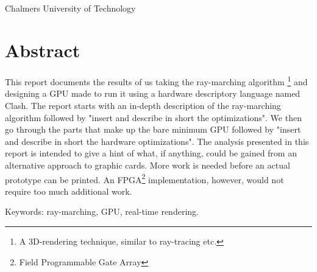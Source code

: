 \varHeadline\\
\varSubtitle\\
\varNames\\
\varDepartment\\
Chalmers University of Technology \setlength{\parskip}{0.5cm}

\thispagestyle{plain}			%
\setlength{\parskip}{0pt plus 1.0pt}
\section*{Abstract}

This report documents the results of us taking the ray-marching algorithm
\footnote{A 3D-rendering technique, similar to ray-tracing etc.} and designing
a GPU made to run it using a hardware descriptory language named
Clash.\cite{Raa2015a} The report starts with an in-depth description of the
ray-marching algorithm followed by "insert and describe in short the
optimizations". We then go through the parts that make up the bare minimum GPU
followed by "insert and describe in short the hardware optimizations". The
analysis presented in this report is intended to give a hint of what, if
anything, could be gained from an alternative approach to graphic cards. More
work is needed before an actual prototype can be printed. An
FPGA\footnote{Field Programmable Gate Array} implementation, however, would not
require too much additional work.


\vfill
Keywords: ray-marching, GPU, real-time rendering.

\newpage				%
\thispagestyle{empty}
\mbox{}

